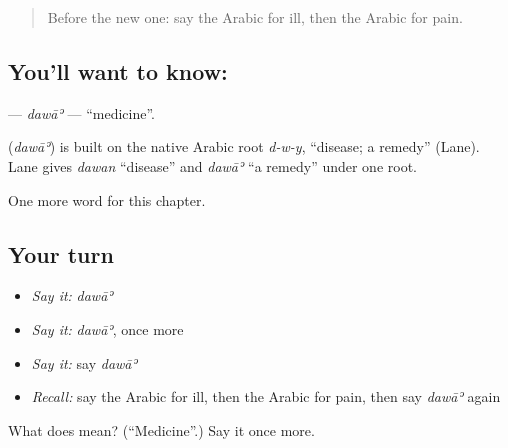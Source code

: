 \label{lesson:AR-C53-dawa}



\begin{quote}
Before the new one: say the Arabic for ill, then the Arabic for pain.
\end{quote}

\subsection*{You'll want to know: }
\textbf{} — \emph{dawāʾ} — \textquotedblleft{}medicine\textquotedblright{}.

\begin{cousinweb}
\textbf{} (\emph{dawāʾ}) is built on the native Arabic root \emph{d-w-y}, \textquotedblleft{}disease; a remedy\textquotedblright{} (Lane). Lane gives \emph{dawan} \textquotedblleft{}disease\textquotedblright{} and \emph{dawāʾ} \textquotedblleft{}a remedy\textquotedblright{} under one root.
\end{cousinweb}

\begin{grammarlens}[title={What you've built}]
One more word for this chapter.
\end{grammarlens}

\subsection*{Your turn}
\begin{itemize}
\raggedright
  \item \emph{Say it:} \emph{dawāʾ}
  \item \emph{Say it:} \emph{dawāʾ}, once more
  \item \emph{Say it:} say \emph{dawāʾ}
  \item \emph{Recall:} say the Arabic for ill, then the Arabic for pain, then say \emph{dawāʾ} again
\end{itemize}

\begin{tcolorbox}[breakable,colback=teal!4,colframe=teal!35!black,title={Before you move on}]
What does  mean? (\textquotedblleft{}Medicine\textquotedblright{}.) Say it once more.
\end{tcolorbox}
